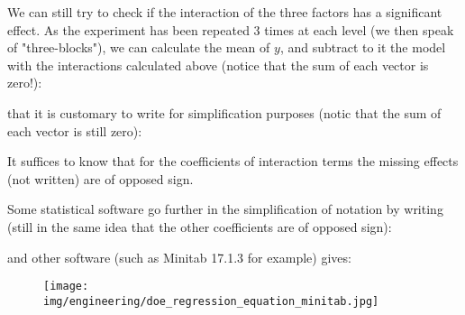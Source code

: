 	We can still try to check if the interaction of the three factors has a significant effect. As the experiment has been repeated $3$ times at each level (we then speak of "three-blocks"), we can calculate the mean of $y$, and subtract to it the model with the interactions calculated above (notice that the sum of each vector is zero!):
	
	that it is customary to write for simplification purposes (notic that the sum of each vector is still zero):
	
	\begin{tcolorbox}[title=Remark,colframe=black,arc=10pt]
	It suffices to know that for the coefficients of interaction terms the missing effects (not written) are of opposed sign.
	\end{tcolorbox}
	Some statistical software go further in the simplification of notation by writing (still in the same idea that the other coefficients are of opposed sign):
	
	and other software (such as Minitab 17.1.3 for example) gives:
	\begin{figure}[H]
		\centering
		\texttt{[image: img/engineering/doe\_regression\_equation\_minitab.jpg]}	
	\end{figure}

